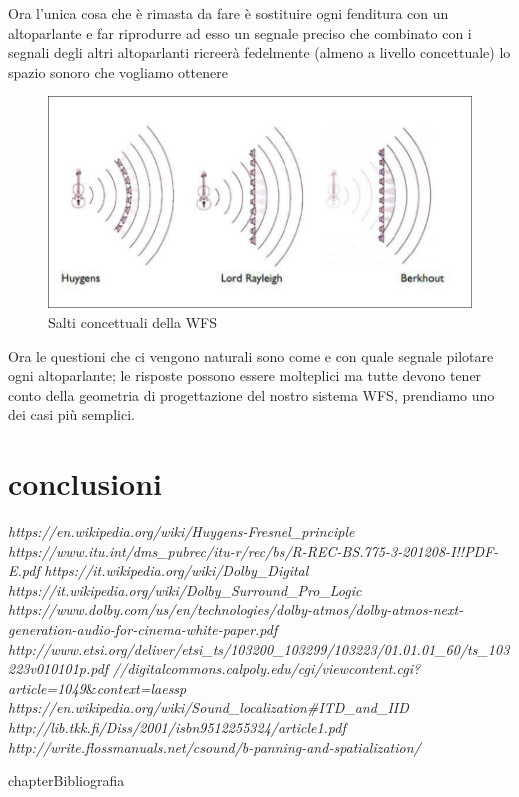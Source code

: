 \documentclass[12pt,a4paper]{report}
\begin{document}
Ora l'unica cosa che è rimasta da fare è sostituire ogni fenditura con un altoparlante e far riprodurre ad esso un  segnale preciso che combinato con i segnali degli altri altoparlanti ricreerà fedelmente (almeno a livello concettuale) lo spazio sonoro che vogliamo ottenere

\begin{figure}[htbp]
	\centering
	\includegraphics[scale=0.55]{figures/wfs.png}
	\caption {Salti concettuali della WFS} 
	\label{fig:wfs}
	\end{figure}
	

Ora le questioni che ci vengono naturali sono come e con quale segnale pilotare ogni altoparlante; le risposte possono essere molteplici ma tutte devono tener conto della geometria di progettazione del nostro sistema WFS, prendiamo uno dei casi più semplici.\\


\chapter*{conclusioni}



\begin{thebibliography}{}

 \textit{https://en.wikipedia.org/wiki/Huygens-Fresnel\_principle}
 \textit{https://www.itu.int/dms\_pubrec/itu-r/rec/bs/R-REC-BS.775-3-201208-I!!PDF-E.pdf}
 \textit{https://it.wikipedia.org/wiki/Dolby\_Digital}
 \textit{https://it.wikipedia.org/wiki/Dolby\_Surround\_Pro\_Logic}
 \textit{https://www.dolby.com/us/en/technologies/dolby-atmos/dolby-atmos-next-generation-audio-for-cinema-white-paper.pdf}
\textit{http://www.etsi.org/deliver/etsi\_ts/103200\_103299/103223/01.01.01\_60/ts\_103223v010101p.pdf}
\textit{//digitalcommons.calpoly.edu/cgi/viewcontent.cgi?article=1049}\&\textit{context=laessp}
 \textit{https://en.wikipedia.org/wiki/Sound\_localization\#ITD\_and\_IID}
 \textit{http://lib.tkk.fi/Diss/2001/isbn9512255324/article1.pdf}
 \textit{http://write.flossmanuals.net/csound/b-panning-and-spatialization/}
\end{thebibliography}
 {chapter}{Bibliografia}
\end{document}
